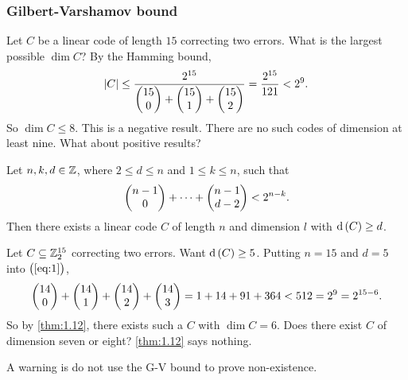 \pagebreak

\subsubsection{Gilbert-Varshamov bound}

\begin{example*}
Let $ C $ be a linear code of length $ 15 $ correcting two errors. What is the largest possible $ \dim C $? By the Hamming bound,
$$ \abs{C} \le \dfrac{2^{15}}{\begin{pmatrix} 15 \\ 0 \end{pmatrix} + \begin{pmatrix} 15 \\ 1 \end{pmatrix} + \begin{pmatrix} 15 \\ 2 \end{pmatrix}} = \dfrac{2^{15}}{121} < 2^9. $$
So $ \dim C \le 8 $. This is a negative result. There are no such codes of dimension at least nine. What about positive results?
\end{example*}

\begin{theorem}[G-V bound]
\label{thm:1.12}
Let $ n, k, d \in \mathbb{Z} $, where $ 2 \le d \le n $ and $ 1 \le k \le n $, such that
\begin{equation}
\label{eq:1}
\begin{pmatrix} n - 1 \\ 0 \end{pmatrix} + \dots + \begin{pmatrix} n - 1 \\ d - 2 \end{pmatrix} < 2^{n - k}.
\end{equation}
Then there exists a linear code $ C $ of length $ n $ and dimension $ l $ with $ \d\br{C} \ge d $.
\end{theorem}

\begin{example*}
Let $ C \subseteq \mathbb{Z}_2^{15} $ correcting two errors. Want $ \d\br{C} \ge 5 $. Putting $ n = 15 $ and $ d = 5 $ into $ \br{\ref{eq:1}} $,
$$ \begin{pmatrix} 14 \\ 0 \end{pmatrix} + \begin{pmatrix} 14 \\ 1 \end{pmatrix} + \begin{pmatrix} 14 \\ 2 \end{pmatrix} + \begin{pmatrix} 14 \\ 3 \end{pmatrix} = 1 + 14 + 91 + 364 < 512 = 2^9 = 2^{15 - 6}. $$
So by \ref{thm:1.12}, there exists such a $ C $ with $ \dim C = 6 $. Does there exist $ C $ of dimension seven or eight? \ref{thm:1.12} says nothing.
\end{example*}

A warning is do not use the G-V bound to prove non-existence.

